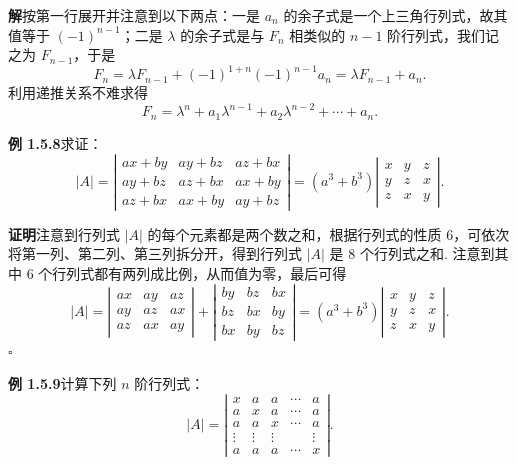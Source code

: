 \documentclass[UTF8, 12pt, fontset=fandol, oneside]{ctexart}
\begin{document}
\noindent\textbf{解}\quad 按第一行展开并注意到以下两点：一是 $a_n$ 的余子式是一个上三角行列式，故其值等于 $(-1)^{n-1}$；二是 $\lambda$ 的余子式是与 $F_n$ 相类似的 $n-1$ 阶行列式，我们记之为 $F_{n-1}$，于是
\[
F_n=\lambda F_{n-1}+(-1)^{1+n}(-1)^{n-1}a_n=\lambda F_{n-1}+a_n.
\]
利用递推关系不难求得
\[
F_n=\lambda^n+a_1\lambda^{n-1}+a_2\lambda^{n-2}+\cdots+a_n.
\]

\noindent\textbf{例 1.5.8}\quad 求证：
\[
|A|=
\left|\begin{array}{ccc}
ax+by & ay+bz & az+bx\\
ay+bz & az+bx & ax+by\\
az+bx & ax+by & ay+bz
\end{array}\right|
=(a^3+b^3)
\left|\begin{array}{ccc}
x & y & z\\
y & z & x\\
z & x & y
\end{array}\right|.
\]

\noindent\textbf{证明}\quad 注意到行列式 $|A|$ 的每个元素都是两个数之和，根据行列式的性质 6，可依次将第一列、第二列、第三列拆分开，得到行列式 $|A|$ 是 8 个行列式之和. 注意到其中 6 个行列式都有两列成比例，从而值为零，最后可得
\[
|A|=
\left|\begin{array}{ccc}
ax & ay & az\\
ay & az & ax\\
az & ax & ay
\end{array}\right|
+
\left|\begin{array}{ccc}
by & bz & bx\\
bz & bx & by\\
bx & by & bz
\end{array}\right|
=(a^3+b^3)
\left|\begin{array}{ccc}
x & y & z\\
y & z & x\\
z & x & y
\end{array}\right|.
\]
\(\square\)

\noindent\textbf{例 1.5.9}\quad 计算下列 $n$ 阶行列式：
\[
|A|=
\left|\begin{array}{ccccc}
x & a & a & \cdots & a\\
a & x & a & \cdots & a\\
a & a & x & \cdots & a\\
\vdots & \vdots & \vdots & & \vdots\\
a & a & a & \cdots & x
\end{array}\right|.
\]
\end{document}
